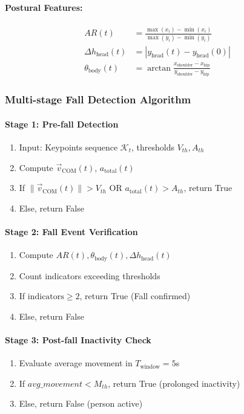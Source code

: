 \paragraph{Postural Features:}
\begin{align}
AR(t) &= \frac{\max(x_i)-\min(x_i)}{\max(y_i)-\min(y_i)} \\
\Delta h_{\text{head}}(t) &= |y_{\text{head}}(t) - y_{\text{head}}(0)| \\
\theta_{\text{body}}(t) &= \arctan\frac{x_{\text{shoulder}}-x_{\text{hip}}}{y_{\text{shoulder}}-y_{\text{hip}}}
\end{align}

\subsubsection{Multi-stage Fall Detection Algorithm}

\paragraph{Stage 1: Pre-fall Detection}
\begin{enumerate}
    \item Input: Keypoints sequence $\mathcal{K}_t$, thresholds $V_{th}, A_{th}$
    \item Compute $\vec{v}_{\text{COM}}(t)$, $a_{\text{total}}(t)$
    \item If $\|\vec{v}_{\text{COM}}(t)\| > V_{th}$ OR $a_{\text{total}}(t) > A_{th}$, return True
    \item Else, return False
\end{enumerate}

\paragraph{Stage 2: Fall Event Verification}
\begin{enumerate}
    \item Compute $AR(t), \theta_{\text{body}}(t), \Delta h_{\text{head}}(t)$
    \item Count indicators exceeding thresholds
    \item If $\text{indicators} \ge 2$, return True (Fall confirmed)
    \item Else, return False
\end{enumerate}

\paragraph{Stage 3: Post-fall Inactivity Check}
\begin{enumerate}
    \item Evaluate average movement in $T_{\text{window}} = 5$s
    \item If $avg\_movement < M_{th}$, return True (prolonged inactivity)
    \item Else, return False (person active)
\end{enumerate}

